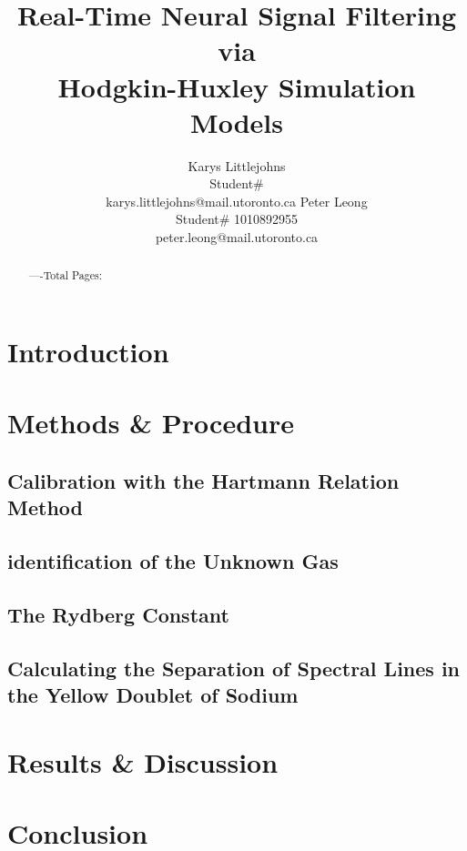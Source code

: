 \documentclass{article} %
\title{Real-Time Neural Signal Filtering via \\
Hodgkin-Huxley Simulation Models}
\author{Karys Littlejohns\\
Student\# \\
karys.littlejohns@mail.utoronto.ca
\And
Peter Leong \\
Student\# 1010892955 \\
peter.leong@mail.utoronto.ca \\
\AND
}
\begin{document}
\maketitle

\vspace{-6ex}

\begin{abstract}

----Total Pages: \pageref{last_page}
\end{abstract}

\vspace{2ex}

\begin{multicols}{2}

\section{Introduction}

\section{Methods & Procedure}



\subsection{Calibration with the Hartmann Relation Method}

\subsection{identification of the Unknown Gas}

\subsection{The Rydberg Constant}

\subsection{Calculating the Separation of Spectral Lines in the Yellow Doublet of Sodium}

\section{Results \& Discussion}

\section{Conclusion}

\label{last_page}

\newpage



\end{multicols}
\end{document}
